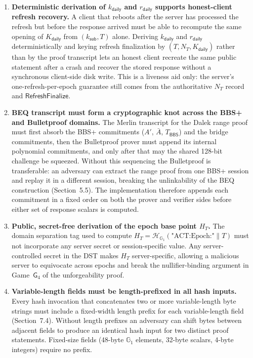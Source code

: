 \documentclass[11pt]{article}
\theoremstyle{definitionstyle}
\theoremstyle{plain}
\begin{document}
\begin{enumerate}[leftmargin=*,label=\textbf{C\arabic*.}]
\item \textbf{Deterministic derivation of $k_{\mathsf{daily}}$ and $r_{\mathsf{daily}}$
  supports honest-client refresh recovery.}
  A client that reboots after the server has processed the refresh but before
  the response arrived must be able to recompute the same opening of
  $K_{\mathsf{daily}}$ from $(k_{\mathsf{sub}},T)$ alone.  Deriving
  $k_{\mathsf{daily}}$ and $r_{\mathsf{daily}}$ deterministically and keying
  refresh finalization by $(T,N_T,K_{\mathsf{daily}})$ rather than by the proof
  transcript lets an honest client recreate the same public statement after a
  crash and recover the stored response without a synchronous client-side disk
  write.  This is a liveness aid only: the server's one-refresh-per-epoch
  guarantee still comes from the authoritative $N_T$ record and
  $\mathsf{RefreshFinalize}$.

\item \textbf{BEQ transcript must form a cryptographic knot across the BBS+ and Bulletproof domains.}
  The Merlin transcript for the Dalek range proof must first absorb the BBS+
  commitments ($A'$, $\bar{A}$, $T_{\mathsf{BBS}}$) and the bridge commitments,
  then the Bulletproof prover must append its internal polynomial commitments,
  and only after that may the shared 128-bit challenge be squeezed.  Without
  this sequencing the Bulletproof is transferable: an adversary can extract the
  range proof from one BBS+ session and replay it in a different session,
  breaking the unlinkability of the BEQ construction (Section~5.5).  The
  implementation therefore appends each commitment in a fixed order on both the
  prover and verifier sides before either set of response scalars is computed.

\item \textbf{Public, secret-free derivation of the epoch base point $H_T$.}
  The domain separation tag used to compute $H_T = \mathcal{H}_{\mathbb{G}_1}(
  \text{"ACT:Epoch:"} \parallel T)$ must not incorporate any server secret
  or session-specific value.  Any server-controlled secret in the DST makes
  $H_T$ server-specific, allowing a malicious server to equivocate across
  epochs and break the nullifier-binding argument in Game~$\mathsf{G}_4$ of
  the unforgeability proof.

\item \textbf{Variable-length fields must be length-prefixed in all hash inputs.}
  Every hash invocation that concatenates two or more variable-length byte
  strings must include a fixed-width length prefix for each variable-length
  field (Section~7.4).  Without length prefixes an adversary can shift bytes
  between adjacent fields to produce an identical hash input for two distinct
  proof statements.  Fixed-size fields (48-byte $\mathbb{G}_1$ elements,
  32-byte scalars, 4-byte integers) require no prefix.


\end{enumerate}
\end{document}
